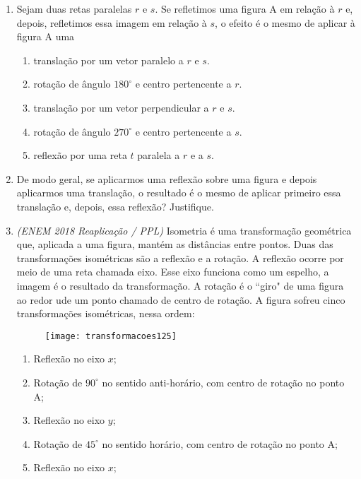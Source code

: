 \begin{enumerate}
\item Sejam duas retas paralelas $r$ e $s$. Se refletimos uma figura A em relação à $r$ e, depois, refletimos essa imagem em relação à $s$, o efeito é o mesmo de aplicar à figura A uma
\begin{enumerate}
\item translação por um vetor paralelo a $r$ e $s$. 
\item rotação de ângulo $180^{\circ}$ e centro pertencente a $r$.
\item translação por um vetor perpendicular a $r$ e $s$.
\item rotação de ângulo $270^{\circ}$ e centro pertencente a $s$.
\item reflexão por uma reta $t$ paralela a $r$ e a $s$.
\end{enumerate}

\item De modo geral, se aplicarmos uma reflexão sobre uma figura e depois aplicarmos uma translação, o resultado é o mesmo de aplicar primeiro essa translação e, depois, essa reflexão? Justifique. 

\item \textit{(ENEM 2018 Reaplicação / PPL)} Isometria é uma transformação geométrica que, aplicada a uma figura, mantém as distâncias entre pontos. Duas das transformações isométricas são a reflexão e a rotação. A reflexão ocorre por meio de uma reta chamada eixo. Esse eixo funciona como um espelho, a imagem é o resultado da transformação. A rotação é o ``giro" de uma figura ao redor ude um ponto chamado de centro de rotação. A figura sofreu cinco transformações isométricas, nessa ordem:

\begin{figure}[H]
\centering

\texttt{[image: transformacoes125]}
\end{figure}

\begin{enumerate}[label=\arabic*\super{a})]
\item Reflexão no eixo $x$;
\item Rotação de $90^{\circ}$ no sentido anti-horário, com centro de rotação no ponto A;
\item Reflexão no eixo $y$;
\item Rotação de $45^{\circ}$ no sentido horário, com centro de rotação no ponto A;
\item Reflexão no eixo $x$;
\end{enumerate}


\end{enumerate}
